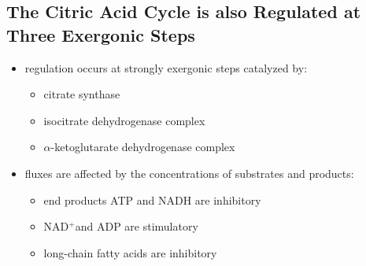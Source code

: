 \documentclass[10pt]{article}
\newcommand{\pc}{$^+$}
\begin{document}
\subsection*{The Citric Acid Cycle is also Regulated at Three Exergonic Steps}
\begin{itemize}
	\item regulation occurs at strongly exergonic steps catalyzed by:
	\begin{itemize}
        \item citrate synthase
        \item isocitrate dehydrogenase complex
        \item $\alpha$-ketoglutarate dehydrogenase complex
    \end{itemize}
    \item fluxes are affected by the concentrations of substrates and products:
    \begin{itemize}
        \item end products ATP and NADH are inhibitory
        \item NAD\pc and ADP are stimulatory
        \item long-chain fatty acids are inhibitory
    \end{itemize}
\end{itemize}
\end{document}
